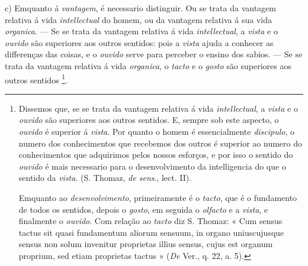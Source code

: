 c) Emquanto á \emph{vantagem}, é necessario distinguir. Ou se trata da vantagem relativa á vida \emph{intellectual} do homem, ou da vantagem relativa á sua vida \emph{organica}. --- Se se trata da vantagem relativa á vida \emph{intellectual}, a \emph{vista} e o \emph{ouvido} são superiores aos outros sentidos: pois a \emph{vista} ajuda a conhecer as differenças das coisas, e o \emph{ouvido} serve para perceber o   ensino dos sabios. --- Se se trata da vantagem relativa á vida \emph{organica}, o \emph{tacto} e o \emph{gosto} são superiores aos outros sentidos \footnote{Dissemos que, se se trata da vantagem relativa á vida \emph{intellectual}, a \emph{vista} e o \emph{ouvido} são superiores aos outros sentidos. E, sempre sob este aspecto, o \emph{ouvido} é superior á \emph{vista}. Por quanto o homem é essencialmente \emph{discipulo}, o numero dos conhecimentos que recebemos dos outros é superior ao numero do conhecimentos que adquirimos pelos nossos esforços, e por isso o sentido do \emph{ouvido} é mais necessario para o desenvolvimento da intelligencia do que o sentido da \emph{vista}. (S. Thomaz, \emph{de sens}., lect. II).\par Emquanto ao \emph{desenvolvimento}, primeiramente é o \emph{tacto}, que é o fundamento de todos os sentidos, depois o \emph{gosto}, em seguida o \emph{olfacto} e a \emph{vista}, e finalmente o \emph{ouvido}. Com relação ao \emph{tacto} diz S. Thomaz: « Cum sensus tactus sit quasi fundamentum aliorum sensuum, in organo uniuscujusque sensus non solum invenitur proprietas illius sensus, cujus est organum proprium, sed etiam proprietas tactus » (\emph{De} Ver., q. 22, a. 5).}.
